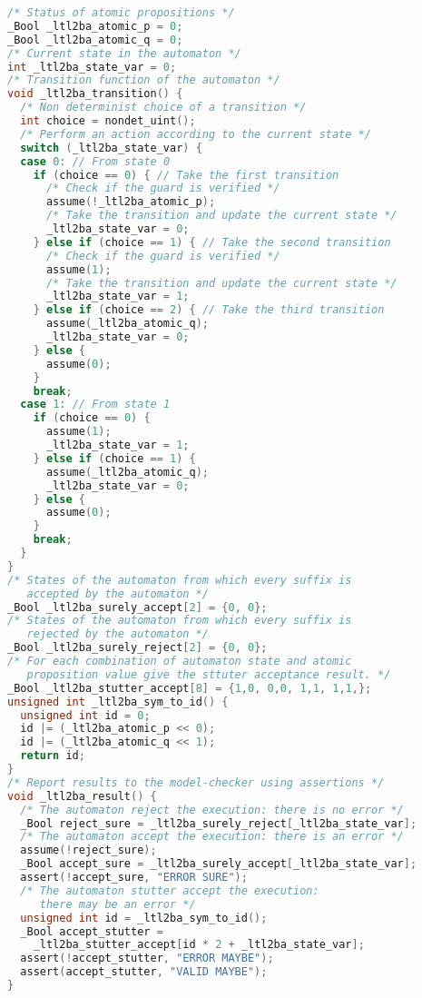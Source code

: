 \begin{lstlisting}[language=C, frame=single, label=lst:C_automaton,
    caption=Code de l'automate représentant \(G (p \implies F q)\)]
/* Status of atomic propositions */
_Bool _ltl2ba_atomic_p = 0;
_Bool _ltl2ba_atomic_q = 0;
/* Current state in the automaton */
int _ltl2ba_state_var = 0;
/* Transition function of the automaton */
void _ltl2ba_transition() {
  /* Non determinist choice of a transition */
  int choice = nondet_uint();
  /* Perform an action according to the current state */
  switch (_ltl2ba_state_var) {
  case 0: // From state 0
    if (choice == 0) { // Take the first transition
      /* Check if the guard is verified */
      assume(!_ltl2ba_atomic_p);
      /* Take the transition and update the current state */
      _ltl2ba_state_var = 0;
    } else if (choice == 1) { // Take the second transition
      /* Check if the guard is verified */
      assume(1);
      /* Take the transition and update the current state */
      _ltl2ba_state_var = 1;
    } else if (choice == 2) { // Take the third transition
      assume(_ltl2ba_atomic_q);
      _ltl2ba_state_var = 0;
    } else {
      assume(0);
    }
    break;
  case 1: // From state 1
    if (choice == 0) {
      assume(1);
      _ltl2ba_state_var = 1;
    } else if (choice == 1) {
      assume(_ltl2ba_atomic_q);
      _ltl2ba_state_var = 0;
    } else {
      assume(0);
    }
    break;
  }
}
/* States of the automaton from which every suffix is
   accepted by the automaton */
_Bool _ltl2ba_surely_accept[2] = {0, 0};
/* States of the automaton from which every suffix is
   rejected by the automaton */
_Bool _ltl2ba_surely_reject[2] = {0, 0};
/* For each combination of automaton state and atomic
   proposition value give the sttuter acceptance result. */
_Bool _ltl2ba_stutter_accept[8] = {1,0, 0,0, 1,1, 1,1,};
unsigned int _ltl2ba_sym_to_id() {
  unsigned int id = 0;
  id |= (_ltl2ba_atomic_p << 0);
  id |= (_ltl2ba_atomic_q << 1);
  return id;
}
/* Report results to the model-checker using assertions */
void _ltl2ba_result() {
  /* The automaton reject the execution: there is no error */
  _Bool reject_sure = _ltl2ba_surely_reject[_ltl2ba_state_var];
  /* The automaton accept the execution: there is an error */
  assume(!reject_sure);
  _Bool accept_sure = _ltl2ba_surely_accept[_ltl2ba_state_var];
  assert(!accept_sure, "ERROR SURE");
  /* The automaton stutter accept the execution:
     there may be an error */
  unsigned int id = _ltl2ba_sym_to_id();
  _Bool accept_stutter =
    _ltl2ba_stutter_accept[id * 2 + _ltl2ba_state_var];
  assert(!accept_stutter, "ERROR MAYBE");
  assert(accept_stutter, "VALID MAYBE");
}
\end{lstlisting}

